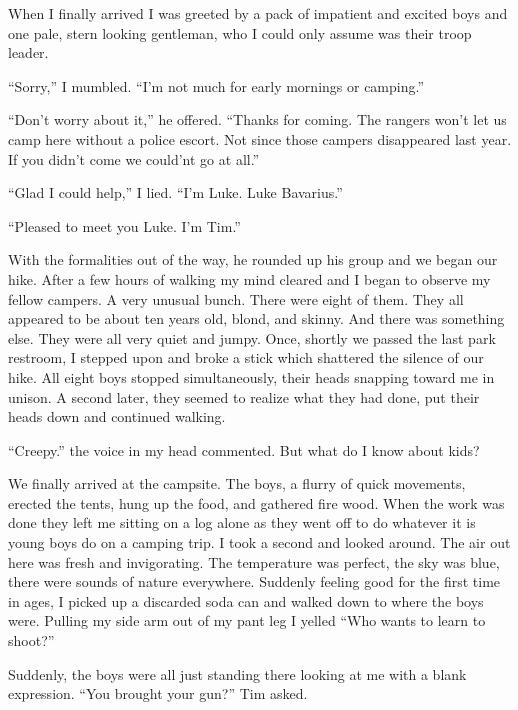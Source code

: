 When I finally arrived I was greeted by a pack of impatient and
excited boys and one pale, stern looking gentleman, who I could
only assume was their troop leader.



``Sorry,'' I mumbled. ``I'm not much for early mornings or
camping.''



``Don't worry about it,'' he offered. ``Thanks for coming. The rangers
won't let us camp here without a police escort. Not since those
campers disappeared last year. If you didn't come we could'nt go at
all.''



``Glad I could help,'' I lied. ``I'm Luke. Luke Bavarius.''



``Pleased to meet you Luke. I'm Tim.''



With the formalities out of the way, he rounded up his group and we
began our hike. After a few hours of walking my mind cleared and I
began to observe my fellow campers. A very unusual bunch. There
were eight of them. They all appeared to be about ten years old,
blond, and skinny. And there was something else. They were all very
quiet and jumpy. Once, shortly we passed the last park restroom, I
stepped upon and broke a stick which shattered the silence of our
hike. All eight boys stopped simultaneously, their heads snapping
toward me in unison. A second later, they seemed to realize what
they had done, put their heads down and continued walking.



``Creepy.'' the voice in my head commented. But what do I know about
kids?



We finally arrived at the campsite. The boys, a flurry of quick
movements, erected the tents, hung up the food, and gathered fire
wood. When the work was done they left me sitting on a log alone as
they went off to do whatever it is young boys do on a camping trip.
I took a second and looked around. The air out here was fresh and
invigorating. The temperature was perfect, the sky was blue, there
were sounds of nature everywhere. Suddenly feeling good for the
first time in ages, I picked up a discarded soda can and walked
down to where the boys were. Pulling my side arm out of my pant leg
I yelled ``Who wants to learn to shoot?''



Suddenly, the boys were all just standing there looking at me with
a blank expression. ``You brought your gun?'' Tim asked.



